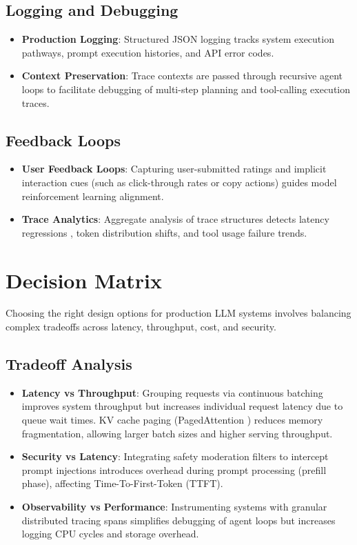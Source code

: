 \documentclass[11pt]{article}
\begin{document}
\subsection{Logging and Debugging}

\begin{itemize}
  \item \textbf{Production Logging}: Structured JSON logging tracks system execution pathways, prompt execution histories, and API error codes.
  \item \textbf{Context Preservation}: Trace contexts are passed through recursive agent loops to facilitate debugging of multi-step planning and tool-calling execution traces.
\end{itemize}

\subsection{Feedback Loops}

\begin{itemize}
  \item \textbf{User Feedback Loops}: Capturing user-submitted ratings and implicit interaction cues (such as click-through rates or copy actions) guides model reinforcement learning alignment.
  \item \textbf{Trace Analytics}: Aggregate analysis of trace structures detects latency regressions \cite{source-prometheus-2015}, token distribution shifts, and tool usage failure trends.
\end{itemize}

\section{Decision Matrix}

Choosing the right design options for production LLM systems involves balancing complex tradeoffs across latency, throughput, cost, and security.

\subsection{Tradeoff Analysis}

\begin{itemize}
  \item \textbf{Latency vs Throughput}: Grouping requests via continuous batching improves system throughput but increases individual request latency due to queue wait times. KV cache paging (PagedAttention \cite{source-kv-cache-2023}) reduces memory fragmentation, allowing larger batch sizes and higher serving throughput.
  \item \textbf{Security vs Latency}: Integrating safety moderation filters to intercept prompt injections \cite{source-adversarial-2024} introduces overhead during prompt processing (prefill phase), affecting Time-To-First-Token (TTFT).
  \item \textbf{Observability vs Performance}: Instrumenting systems with granular distributed tracing spans \cite{source-dapper-2010} simplifies debugging of agent loops but increases logging CPU cycles and storage overhead.
\end{itemize}
\end{document}
